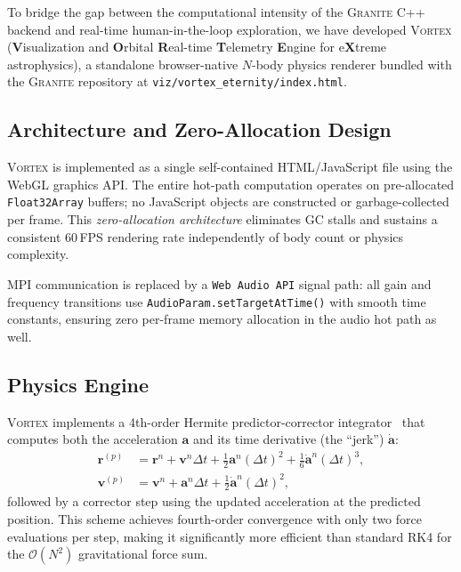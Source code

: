 \documentclass[aps,prd,twocolumn,superscriptaddress,nofootinbib,showpacs,
               longbibliography]{revtex4-2}
\newcommand{\granite}{\textsc{Granite}}
\newcommand{\code}[1]{\texttt{#1}}
\newcommand{\order}[1]{\mathcal{O}(#1)}
\begin{document}
To bridge the gap between the computational intensity of the \granite{}
C++ backend and real-time human-in-the-loop exploration, we have developed
\textsc{Vortex} (\textbf{V}isualization and \textbf{O}rbital
\textbf{R}eal-time \textbf{T}elemetry \textbf{E}ngine for e\textbf{X}treme
astrophysics), a standalone browser-native $N$-body physics renderer bundled
with the \granite{} repository at
\code{viz/vortex\_eternity/index.html}.

\subsection{Architecture and Zero-Allocation Design}
\label{sec:vortex_arch}

\textsc{Vortex} is implemented as a single self-contained HTML/JavaScript
file using the WebGL graphics API.
The entire hot-path computation operates on pre-allocated
\code{Float32Array} buffers; no JavaScript objects are constructed or
garbage-collected per frame.
This \emph{zero-allocation architecture} eliminates GC stalls and sustains
a consistent 60\,FPS rendering rate independently of body count or physics
complexity.

MPI communication is replaced by a \code{Web Audio API} signal path:
all gain and frequency transitions use \code{AudioParam.setTargetAtTime()}
with smooth time constants, ensuring zero per-frame memory allocation in
the audio hot path as well.

\subsection{Physics Engine}
\label{sec:vortex_physics}

\textsc{Vortex} implements a 4th-order Hermite predictor-corrector
integrator~\cite{MakinoAarseth1992} that computes both the acceleration
$\mathbf{a}$ and its time derivative (the ``jerk'') $\dot{\mathbf{a}}$:
\begin{align}
  \mathbf{r}^{(p)} &= \mathbf{r}^n + \mathbf{v}^n\Delta t
    + \tfrac{1}{2}\mathbf{a}^n(\Delta t)^2
    + \tfrac{1}{6}\dot{\mathbf{a}}^n(\Delta t)^3, \\
  \mathbf{v}^{(p)} &= \mathbf{v}^n + \mathbf{a}^n\Delta t
    + \tfrac{1}{2}\dot{\mathbf{a}}^n(\Delta t)^2,
\end{align}
followed by a corrector step using the updated acceleration at the
predicted position.
This scheme achieves fourth-order convergence with only two force
evaluations per step, making it significantly more efficient than
standard RK4 for the $\order{N^2}$ gravitational force sum.
\end{document}
